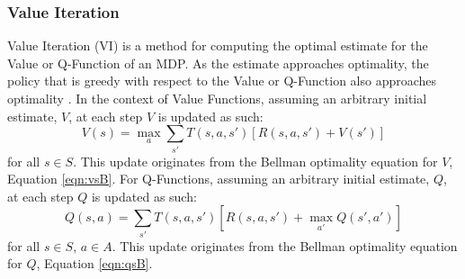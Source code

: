 \subsubsection{Value Iteration}
Value Iteration (VI) \cite{Bellman:1957} is a method for computing the optimal estimate for the Value or Q-Function of an MDP. As the estimate approaches optimality, the policy that is greedy with respect to the Value or Q-Function also approaches optimality \cite{series/synthesis/2010Szepesvari}.
In the context of Value Functions, assuming an arbitrary initial estimate, $V$, at each step $V$ is updated as such:
\begin{equation}
\label{eqn:vupdate}
V(s) = \max_a\sum_{s'}T(s, a, s')[R(s, a, s')+V(s')]
\end{equation}
for all $s \in S$. This update originates from the Bellman optimality equation for $V$, Equation \ref{eqn:vsB}.
For Q-Functions, assuming an arbitrary initial estimate, $Q$, at each step $Q$ is updated as such:
\begin{equation}
\label{eqn:qupdate}
Q(s,a) = \sum_{s'}T(s,a,s')[R(s,a,s') + \max_{a'}Q(s',a')]
\end{equation}
for all $s \in S$, $a \in A$. This update originates from the Bellman optimality equation for $Q$, Equation \ref{eqn:qsB}.

